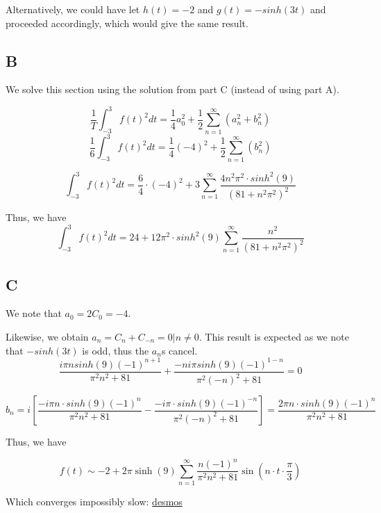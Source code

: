 \documentclass{article}
\begin{document}
Alternatively, we could have let $h(t) = -2$ and $g(t) = -sinh(3t)$ and proceeded accordingly, which would give the same result.

\subsection*{B}

We solve this section using the solution from part C (instead of using part A).

$$\frac{1}{T} \int_{-3}^{3} f(t)^2dt = \frac{1}{4} a_0^2 + \frac{1}{2} \sum_{n=1}^{\infty} \left(a_n^2+b_n^2\right)$$
$$\frac{1}{6} \int_{-3}^{3} f(t)^2dt = \frac{1}{4} (-4)^2 + \frac{1}{2} \sum_{n=1}^{\infty} \left(b_n^2\right)$$

$$
\int_{-3}^{3} f(t)^2 dt = \frac{6}{4} \cdot (-4)^2 + 3 \sum_{n=1}^{\infty} \frac{4 n^2 \pi^2 \cdot sinh^2(9)}{(81+n^2\pi^2)^2}
$$



Thus, we have
$$
\int_{-3}^{3} f(t)^2 dt = 24 + 12 \pi^2 \cdot sinh^2(9) \sum_{n=1}^{\infty} \frac{n^2}{(81+n^2\pi^2)^2}
$$

\subsection*{C}
We note that $a_0 = 2C_0=-4$. 

Likewise, we obtain $a_n = C_n + C_{-n} = 0\Bigr| n\neq 0$. This result is expected as we note that $-sinh(3t)$ is odd, thus the $a_n$s cancel.
$$
\frac{i\pi n sinh(9)\left(-1\right)^{n+1}}{\pi^2n^2+81} + \frac{-n i \pi sinh(9)\left(-1\right)^{1-n}}{\pi^2(-n)^2+81} = 0
$$

$$
b_n = i \left[ \frac{- i \pi n\cdot sinh(9)(-1)^{n}}{\pi^2n^2+81} - \frac{- i \pi \cdot sinh(9) (-1)^{-n}}{\pi^2(-n)^2+81}\right] = \frac{2\pi n \cdot sinh(9) (-1)^n}{\pi^2n^2+81}
$$

Thus, we have

$$
f(t) \sim -2 + 2\pi\sinh\left(9\right)\sum_{n=1}^{\infty}\frac{n\left(-1\right)^{n}}{\pi^{2}n^{2}+81}\sin\left(n\cdot t\cdot\frac{\pi}{3}\right)
$$


Which converges impossibly slow: \href{https://www.desmos.com/calculator/kahvvfuxgb}{desmos}
\end{document}
